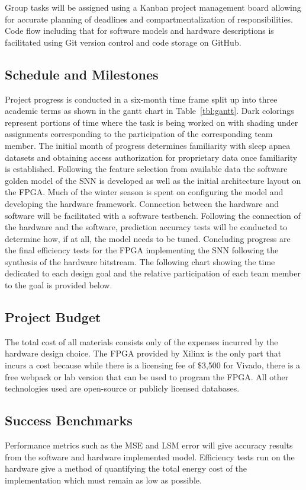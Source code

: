 \documentclass[12pt,titlepage]{article}
\begin{document}
Group tasks will be assigned using a Kanban project management board allowing for accurate planning of deadlines and compartmentalization of responsibilities.
Code flow including that for software models and hardware descriptions is facilitated using Git version control and code storage on GitHub. 

\subsection{Schedule and Milestones}
Project progress is conducted in a six-month time frame split up into three academic terms as shown in the gantt chart in Table~\ref{tbl:gantt}.
Dark colorings represent portions of time where the task is being worked on with shading under assignments corresponding to the participation of
the corresponding team member. The initial month of progress determines familiarity with sleep
apnea datasets and obtaining access authorization for proprietary data once familiarity is established. Following the feature selection from available data
the software golden model of the SNN is developed as well as the initial architecture layout on the FPGA. Much of the winter season is spent on configuring
the model and developing the hardware framework. Connection between the hardware and software will be facilitated with a software testbench. Following the
connection of the hardware and the software, prediction accuracy tests will be conducted to determine how, if at all, the model needs to be tuned. Concluding
progress are the final efficiency tests for the FPGA implementing the SNN following the synthesis of the hardware bitstream. The following chart showing the
time dedicated to each design goal and the relative participation of each team member to the goal is provided below.

\subsection{Project Budget}
The total cost of all materials consists only of the expenses incurred by the hardware design choice. The FPGA provided by Xilinx is the only part that
incurs a cost because while there is a licensing fee of \$3,500 for Vivado, there is a free webpack or lab version that can be used to program the FPGA.
All other technologies used are open-source or publicly licensed databases.

\subsection{Success Benchmarks}
Performance metrics such as the MSE and LSM error will give accuracy results from the software and hardware implemented model. Efficiency tests run on the
hardware give a method of quantifying the total energy cost of the implementation which must remain as low as possible. 
\end{document}
